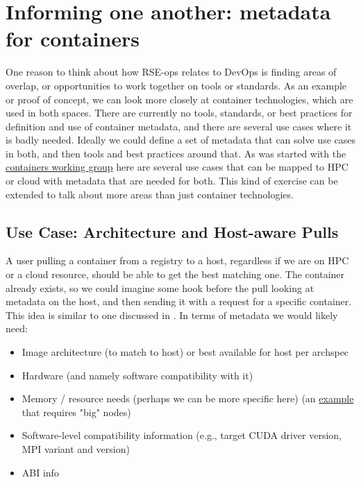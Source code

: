 \section{Informing one another: metadata for containers}

One reason to think about how RSE-ops relates to DevOps is finding areas of overlap, or opportunities to work together on tools or standards. As an example or proof of concept, we can look more closely at container technologies, which are used in both spaces.
There are currently no tools, standards, or best practices for definition and use of container metadata,
and there are several use cases where it is badly needed.
Ideally we could define a set of metadata that can solve use cases in both, and then tools and best practices around that. As was started with the \href{https://supercontainers.github.io/containers-wg}{containers working group} here are several use cases that can be mapped to HPC or cloud with metadata that are needed for both. This kind of exercise can be extended to talk about more areas than just container technologies.

\subsection{Use Case: Architecture and Host-aware Pulls}
A user pulling a container from a registry to a host, regardless if we are on HPC or a cloud resource, should be able to get the best matching one. The container already exists, so we could imagine some hook before the pull looking at metadata on the host, and then sending it with a request for a specific container. This idea is similar to one discussed in \cite{Younge2019-uk}. In terms of metadata we would likely need:

\begin{itemize}
\item Image architecture (to match to host) or best available for host per archspec
\item Hardware (and namely software compatibility with it)
\item Memory / resource needs (perhaps we can be more specific here) (an \href{https://github.com/spack/spack/blob/develop/share/spack/gitlab/cloud\_pipelines/stacks/e4s/spack.yaml\#L347-L364}{example} that requires "big" nodes)
\item Software-level compatibility information (e.g., target CUDA driver version, MPI variant and version)
\item ABI info
\end{itemize}

